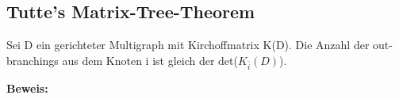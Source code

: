 \graphicspath{{grafiken/}}

\subsection{Tutte's Matrix-Tree-Theorem}
\begin{Tms}
Sei D ein gerichteter Multigraph mit Kirchoffmatrix K(D). Die Anzahl der out-branchings aus dem Knoten i ist gleich der det($K_{\bar{i}}(D)$).
\end{Tms}
\textbf{Beweis:} 
